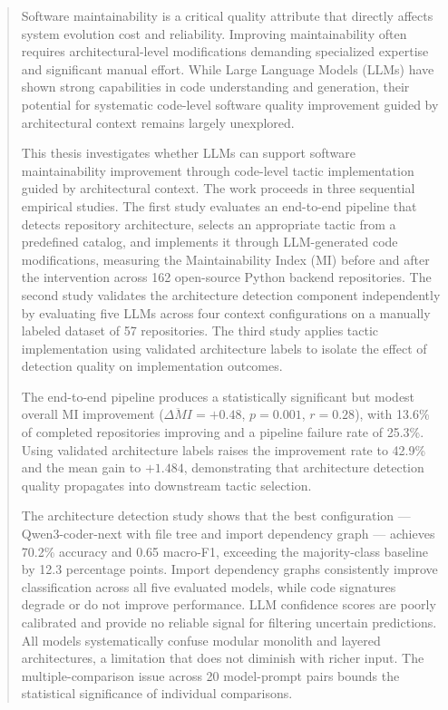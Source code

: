 \begin{abstract}
Software maintainability is a critical quality attribute that directly affects system evolution cost and reliability. Improving maintainability often requires architectural-level modifications demanding specialized expertise and significant manual effort. While Large Language Models (LLMs) have shown strong capabilities in code understanding and generation, their potential for systematic code-level software quality improvement guided by architectural context remains largely unexplored.

This thesis investigates whether LLMs can support software maintainability improvement through code-level tactic implementation guided by architectural context. The work proceeds in three sequential empirical studies. The first study evaluates an end-to-end pipeline that detects repository architecture, selects an appropriate tactic from a predefined catalog, and implements it through LLM-generated code modifications, measuring the Maintainability Index (MI) before and after the intervention across 162 open-source Python backend repositories. The second study validates the architecture detection component independently by evaluating five LLMs across four context configurations on a manually labeled dataset of 57 repositories. The third study applies tactic implementation using validated architecture labels to isolate the effect of detection quality on implementation outcomes.

The end-to-end pipeline produces a statistically significant but modest overall MI improvement ($\overline{\Delta MI} = +0.48$, $p = 0.001$, $r = 0.28$), with 13.6\% of completed repositories improving and a pipeline failure rate of 25.3\%. Using validated architecture labels raises the improvement rate to 42.9\% and the mean gain to $+1.484$, demonstrating that architecture detection quality propagates into downstream tactic selection.

The architecture detection study shows that the best configuration — Qwen3-coder-next with file tree and import dependency graph — achieves 70.2\% accuracy and 0.65 macro-F1, exceeding the majority-class baseline by 12.3 percentage points. Import dependency graphs consistently improve classification across all five evaluated models, while code signatures degrade or do not improve performance. LLM confidence scores are poorly calibrated and provide no reliable signal for filtering uncertain predictions. All models systematically confuse modular monolith and layered architectures, a limitation that does not diminish with richer input. The multiple-comparison issue across 20 model-prompt pairs bounds the statistical significance of individual comparisons.


\end{abstract}
